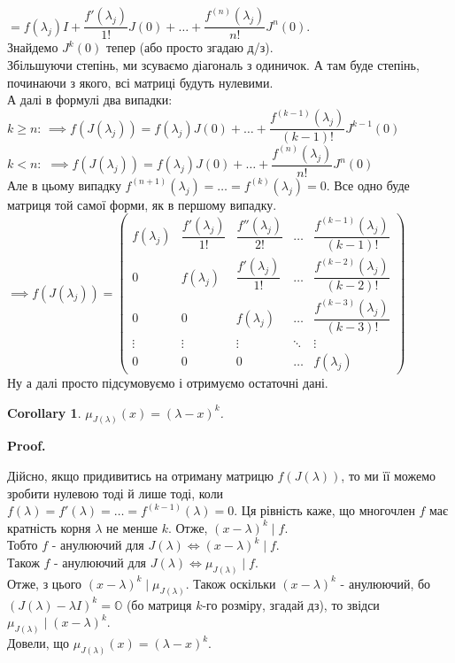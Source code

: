 \documentclass[a4paper, 10pt]{article}
\makeatletter
\theoremstyle{theoremdd}
\newtheorem{corollary}[theorem]{Corollary}
\renewenvironment{proof}[1][Proof.\\]{\par
\pushQED{\hfill \qed}%
\normalfont \topsep6\p@\@plus6\p@\relax
\trivlist
\item\relax
{\bfseries
#1\@addpunct{.}}\hspace\labelsep\ignorespaces
}{%
\popQED\endtrivlist\@endpefalse
}
\makeatother
\begin{document}
$\boxed{=} f(\lambda_j)I + \dfrac{f'(\lambda_j)}{1!}J(0) + \dots + \dfrac{f^{(n)}(\lambda_j)}{n!}J^n(0)$.\\
Знайдемо $J^k(0)$ тепер (або просто згадаю д/з).\\
Збільшуючи степінь, ми зсуваємо діагональ з одиничок. А там буде степінь, починаючи з якого, всі матриці будуть нулевими.\\
А далі в формулі два випадки:\\
$k \geq n$:
$\implies f(J(\lambda_j)) = f(\lambda_j)J(0) + \dots + \dfrac{f^{(k-1)}(\lambda_j)}{(k-1)!}J^{k-1}(0)$\\
$k < n:$
$\implies f(J(\lambda_j)) = f(\lambda_j)J(0) + \dots + \dfrac{f^{(n)}(\lambda_j)}{n!}J^{n}(0)$\\
Але в цьому випадку $f^{(n+1)}(\lambda_j) = \dots = f^{(k)}(\lambda_j) = 0$. Все одно буде матриця той самої форми, як в першому випадку.\\
$\implies f(J(\lambda_j)) = \begin{pmatrix}
 f(\lambda_j) & \dfrac{f'(\lambda_j)}{1!} & \dfrac{f''(\lambda_j)}{2!} & \dots & \dfrac{f^{(k-1)}(\lambda_j)}{(k-1)!} \\
 0 & f(\lambda_j) & \dfrac{f'(\lambda_j)}{1!} & \dots & \dfrac{f^{(k-2)}(\lambda_j)}{(k-2)!} \\
 0 & 0 & f(\lambda_j) & \dots & \dfrac{f^{(k-3)}(\lambda_j)}{(k-3)!} \\
 \vdots & \vdots & \vdots & \ddots & \vdots \\
 0 & 0 & 0 & \dots & f(\lambda_j) 
\end{pmatrix}$\\
Ну а далі просто підсумовуємо і отримуємо остаточні дані.

\begin{corollary}
$\mu_{J(\lambda)}(x) = (\lambda-x)^k$.
\end{corollary}

\begin{proof}
Дійсно, якщо придивитись на отриману матрицю $f(J(\lambda))$, то ми її можемо зробити нулевою тоді й лише тоді, коли $f(\lambda) = f'(\lambda) = \dots = f^{(k-1)}(\lambda) = 0$. Ця рівність каже, що многочлен $f$ має кратність корня $\lambda$ не менше $k$. Отже, $(x-\lambda)^k \mid f$.\\
Тобто $f$ - анулюючий для $J(\lambda) \iff (x-\lambda)^k \mid f$.\\
Також $f$ - анулюючий для $J(\lambda) \iff \mu_{J(\lambda)} \mid f$.\\
Отже, з цього $(x-\lambda)^k \mid \mu_{J(\lambda)}$. Також оскільки $(x-\lambda)^k$ - анулюючий, бо $(J(\lambda) - \lambda I)^k = \mathbb{O}$ (бо матриця $k$-го розміру, згадай дз), то звідси $\mu_{J(\lambda)} \mid (x-\lambda)^k$.\\
Довели, що $\mu_{J(\lambda)}(x) = (\lambda-x)^k$.
\end{proof}
\end{document}
